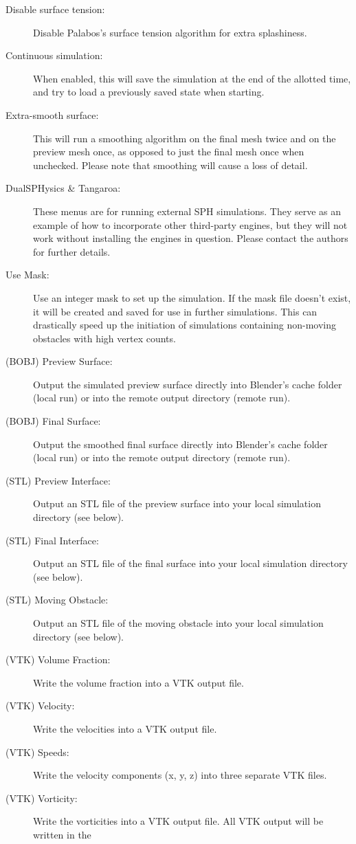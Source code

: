 \documentclass[12pt]{article}
\begin{document}
\begin{description}
\item[Disable surface tension:] Disable Palabos's surface tension algorithm for extra splashiness.
\item[Continuous simulation:] When enabled, this will save the simulation at the end of the allotted time, 
and try to load a previously saved state when starting.
\item[Extra-smooth surface:] This will run a smoothing algorithm on the final mesh twice and on the preview 
mesh once, as opposed to just the final mesh once when unchecked. Please note that smoothing will cause a 
loss of detail.
\item[DualSPHysics \& Tangaroa:] These menus are for running external SPH simulations. They serve as an 
example of how to incorporate other third-party engines, but they will not work without installing the 
engines in question. Please contact the authors for further details.
\item[Use Mask:] Use an integer mask to set up the simulation. If the mask file doesn't exist, it will be 
created and saved for use in further simulations. This can drastically speed up the initiation of simulations 
containing non-moving obstacles with high vertex counts.
\item[(BOBJ) Preview Surface:] Output the simulated preview surface directly into Blender's cache folder 
(local run) or into the remote output directory (remote run).
\item[(BOBJ) Final Surface:] Output the smoothed final surface directly into Blender's cache folder (local 
run) or into the remote output directory (remote run).
\item[(STL) Preview Interface:] Output an STL file of the preview surface into your local simulation 
directory (see below).
\item[(STL) Final Interface:] Output an STL file of the final surface into your local simulation directory 
(see below).
\item[(STL) Moving Obstacle:] Output an STL file of the moving obstacle into your local simulation directory 
(see below).
\item[(VTK) Volume Fraction:] Write the volume fraction into a VTK output file.
\item[(VTK) Velocity:] Write the velocities into a VTK output file.
\item[(VTK) Speeds:] Write the velocity components (x, y, z) into three separate VTK files.
\item[(VTK) Vorticity:] Write the vorticities into a VTK output file. All VTK output will be written in the 

\end{description}
\end{document}

